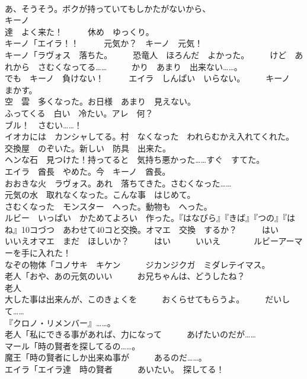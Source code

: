 \documentclass[8pt]{extreport}
\begin{document}
\begin{CJK}{UTF8}{min}
\\	あ、そうそう。ボクが持っていてもしかたがないから、	
\\	キーノ
\\	達　よく来た！　　　休め　ゆっくり。	
\\	キーノ「エイラ！！　　　元気か？　キーノ　元気！	
\\	キーノ「ラヴォス　落ちた。　　　恐竜人　ほろんだ　よかった。　　　けど　あれから　さむくなってる……　　　かり　あまり　出来ない……。	
\\	でも　キーノ　負けない！　　　エイラ　しんぱい　いらない。　　　キーノ　まかす。	
\\	空　雲　多くなった。お日様　あまり　見えない。	
\\	ふってくる　白い　冷たい。アレ　何？	
\\	ブル！　さむい……！	
\\	イオカには　カンシャしてる。村　なくなった　われらむかえ入れてくれた。	
\\	交換屋　のぞいた。新しい　防具　出来た。	
\\	ヘンな石　見つけた！持ってると　気持ち悪かった……すぐ　すてた。	
\\	エイラ　酋長　やめた。今　キーノ　酋長。	
\\	おおきな火　ラヴォス。あれ　落ちてきた。さむくなった……	
\\	元気の水　取れなくなった。こんな事　はじめて。	
\\	さむくなった　モンスター　へった。動物も　へった。	
\\	ルビー　いっぱい　かためてよろい　作った。『はなびら』『きば』『つの』『はね』10コづつ　あわせて40コと交換。オマエ　交換　するか？　　　はい　　　いいえオマエ　まだ　ほしいか？　　　はい　　　いいえ　　　　ルビーアーマーを手に入れた！	
\\	なぞの物体「コノサキ　キケン　　　ジカンジクガ　ミダレテイマス。	
\\	老人「おや、あの元気のいい　　　お兄ちゃんは、どうしたね？	
\\	老人
\\	大した事は出来んが、このきょくを　　　おくらせてもらうよ。　　　だいして……	
\\	『クロノ・リメンバー』……。	
\\	老人「私にできる事があれば、力になって　　　あげたいのだが……	
\\	マール「時の賢者を探してるの……。	
\\	魔王「時の賢者にしか出来ぬ事が　　　あるのだ……。	
\\	エイラ「エイラ達　時の賢者　　　あいたい。　探してる！	

\end{CJK}
\end{document}

